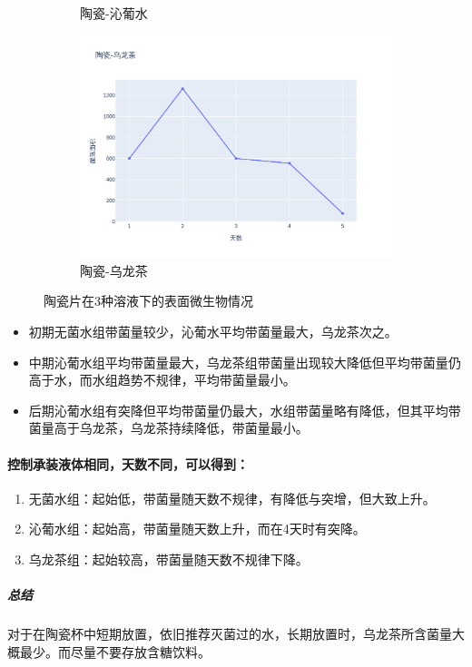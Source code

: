 \documentclass[12pt,a4paper]{ctexart}
\begin{document}
\begin{figure}[htbp]
\begin{subfigure}[b]{0.31\textwidth}
        \caption{陶瓷-沁葡水}
        \label{subfig:2}
    \end{subfigure}
    \hfill  %
    \begin{subfigure}[b]{0.31\textwidth}
        \centering
        \includegraphics[width=\linewidth]{./plot/SingleMaterial/china/陶瓷-乌龙茶_line.png}
        \caption{陶瓷-乌龙茶}
        \label{subfig:3}
    \end{subfigure}
    \caption{陶瓷片在3种溶液下的表面微生物情况}
    \label{fig:triple_horizontal}  %
\end{figure}
\begin{itemize}
    \item 初期无菌水组带菌量较少，沁葡水平均带菌量最大，乌龙茶次之。
    \item 中期沁葡水组平均带菌量最大，乌龙茶组带菌量出现较大降低但平均带菌量仍高于水，而水组趋势不规律，平均带菌量最小。
    \item 后期沁葡水组有突降但平均带菌量仍最大，水组带菌量略有降低，但其平均带菌量高于乌龙茶，乌龙茶持续降低，带菌量最小。
\end{itemize}


\paragraph{控制承装液体相同，天数不同，可以得到：}
\begin{enumerate}
    \item 无菌水组：起始低，带菌量随天数不规律，有降低与突增，但大致上升。
    \item 沁葡水组：起始高，带菌量随天数上升，而在4天时有突降。
    \item 乌龙茶组：起始较高，带菌量随天数不规律下降。
\end{enumerate}
\subparagraph{总结}
对于在陶瓷杯中短期放置\cite{YXWX201209015}，依旧推荐灭菌过的水，长期放置时，乌龙茶所含菌量大概最少。而尽量不要存放含糖饮料。
\end{document}
